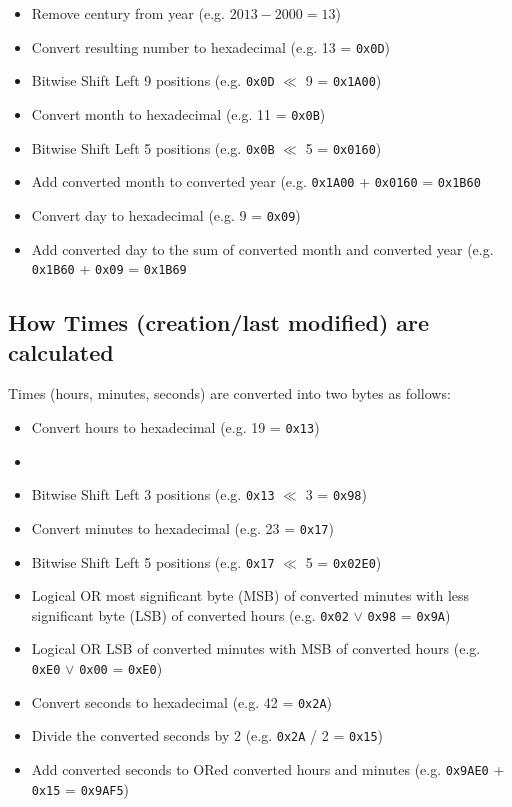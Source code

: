     \begin{itemize}
        \item Remove century from year (e.g. $2013 - 2000 = 13$)
        \item Convert resulting number to hexadecimal (e.g. 13 = \texttt{0x0D})
        \item Bitwise Shift Left 9 positions (e.g. \texttt{0x0D} \(\ll\) 9 = 
        \texttt{0x1A00})
        \item Convert month to hexadecimal (e.g. 11 = \texttt{0x0B})
        \item Bitwise Shift Left 5 positions (e.g. \texttt{0x0B} \(\ll\) 5 = 
        \texttt{0x0160})
        \item Add converted month to converted year (e.g. \texttt{0x1A00} + 
        \texttt{0x0160} = \texttt{0x1B60}
        \item Convert day to hexadecimal (e.g. 9 = \texttt{0x09})
        \item Add converted day to the sum of converted month and converted year
        (e.g. \texttt{0x1B60} + \texttt{0x09} = \texttt{0x1B69}
    \end{itemize}

    \subsection{How Times (creation/last modified) are calculated}

    Times (hours, minutes, seconds) are converted into two bytes as follows:

    \begin{itemize}
        \item Convert hours to hexadecimal (e.g. 19 = \texttt{0x13})
        \item \item Bitwise Shift Left 3 positions (e.g. \texttt{0x13} \(\ll\) 3 = 
        \texttt{0x98})
        \item Convert minutes to hexadecimal (e.g. 23 = \texttt{0x17})
        \item Bitwise Shift Left 5 positions (e.g. \texttt{0x17} \(\ll\) 5 = 
        \texttt{0x02E0})
        \item Logical OR most significant byte (MSB) of converted minutes with
        less significant byte (LSB) of converted hours (e.g. \texttt{0x02}
        \(\lor\) \texttt{0x98} = \texttt{0x9A})
        \item Logical OR LSB of converted minutes with MSB of converted hours
        (e.g. \texttt{0xE0} \(\lor\) \texttt{0x00} = \texttt{0xE0})
        \item Convert seconds to hexadecimal (e.g. 42 = \texttt{0x2A})
        \item Divide the converted seconds by 2 (e.g. \texttt{0x2A} / 2 = 
        \texttt{0x15})
        \item Add converted seconds to ORed converted hours and minutes
        (e.g. \texttt{0x9AE0} + \texttt{0x15} = \texttt{0x9AF5})
    \end{itemize}


